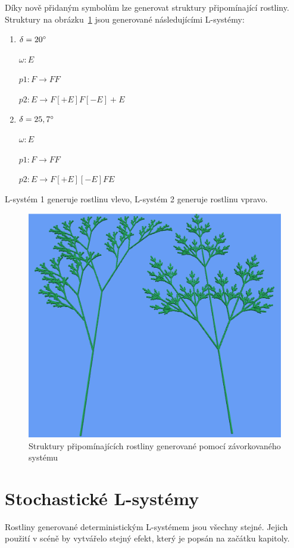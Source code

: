 \documentclass[thesis=M,czech]{FITthesis}[2019/12/23]
\begin{document}
Díky nově přidaným symbolům lze generovat struktury připomínající rostliny. Struktury na obrázku~\ref{fig:plant_like_str} jsou generované následujícími L-systémy:

\begin{enumerate}
\item $\delta = 20\degree$

	$\omega: E$
	
	$p1: F \rightarrow FF$
	
	$p2: E \rightarrow F[+E]F[-E]+E$
	
\item $\delta = 25,7\degree$

	$\omega: E$
	
	$p1: F \rightarrow FF$
	
	$p2: E \rightarrow F[+E][-E]FE$

\end{enumerate}

L-systém 1 generuje rostlinu vlevo, L-systém 2 generuje rostlinu vpravo.

\begin{figure}\centering
	\includegraphics[width=\textwidth]{images/plant_d_e}
	\caption[Struktury připomínajících rostliny]{Struktury připomínajících rostliny generované pomocí závorkovaného systému}\label{fig:plant_like_str}
\end{figure}

\section{Stochastické L-systémy}
Rostliny generované deterministickým L-systémem jsou všechny stejné. Jejich použití v scéně by vytvářelo stejný efekt, který je popsán na začátku kapitoly. 
\end{document}
